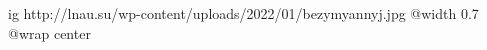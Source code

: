  
 
 
 
 

\ifcmt
  ig http://lnau.su/wp-content/uploads/2022/01/bezymyannyj.jpg
	@width 0.7
	@wrap center
\fi
